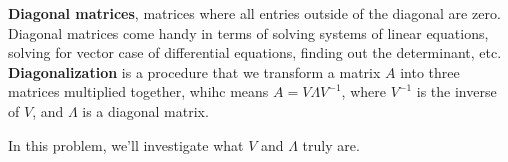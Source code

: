 

\textbf{Diagonal matrices}, matrices where all entries outside of the diagonal are zero.
Diagonal matrices come handy in terms of solving systems of linear equations, solving for vector case of differential equations, finding out the determinant, etc. 
\newline \textbf{Diagonalization} is a procedure that we transform a matrix $A$ into three matrices multiplied together, whihc means 
$A=V{\Lambda}V^{-1}$, where $V^{-1}$ is the inverse of $V$, and $\Lambda$ is a diagonal matrix.

In this problem, we'll investigate what $V$ and $\Lambda$ truly are.

